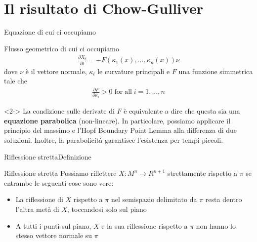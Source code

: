 \section{Il risultato di Chow-Gulliver}


\begin{frame}{Equazione di cui ci occupiamo}{}
	\begin{block}{Flusso geometrico di cui ci occupiamo}
		\begin{align*}
			\frac{\partial X_t}{\partial t} = - F(\kappa_1(x), \dots , \kappa_n(x)) \nu
		\end{align*}
		dove $\nu$ è il vettore normale, $\kappa_i$ le curvature principali e $F$ una funzione simmetrica tale che 
		\begin{align*}
			\frac{\partial F}{\partial \kappa_i} > 0 \mathrm{\; for \; all } \; i=1,\dots, n
		\end{align*}
	\end{block}
	\begin{block}{}<2->
		La condizione sulle derivate di $F$ è equivalente a dire che questa sia una \textbf{equazione parabolica} (non-lineare). In particolare, possiamo applicare il principio del massimo e l'Hopf Boundary Point Lemma alla differenza di due soluzioni. Inoltre, la parabolicità garantisce l'esistenza per tempi piccoli.
	\end{block}
\end{frame}



\begin{frame}{Riflessione stretta}{Definizione}
	\begin{block}{Riflessione stretta}
		 Possiamo riflettere $X : M^n \rightarrow R^{n+1}$ strettamente rispetto a $\pi$ se entrambe le seguenti cose sono vere:
		 \begin{itemize}
		 	\item La riflessione di $X$ rispetto a $\pi$ nel semispazio delimitato da $\pi$ resta dentro l'altra metà di $X$, toccandosi solo sul piano
		 	\item A tutti i punti sul piano, $X$ e la sua riflessione rispetto a $\pi$ non hanno lo stesso vettore normale su $\pi$
		 \end{itemize}
	\end{block}
\end{frame}


